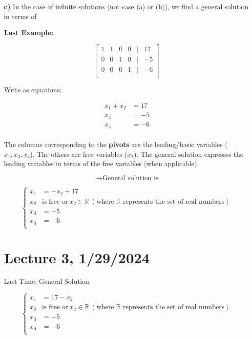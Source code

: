 \documentclass{article}
\begin{document}
\textbf{c)} In the case of infinite solutions (not case (a) or (b)), we find a general solution in terms of 

\medskip

\textbf{Last Example:}

\[
\begin{bmatrix}
    1 & 1 & 0 & 0 & | & 17 \\
    0 & 0 & 1 & 0 & | & -5 \\
    0 & 0 & 0 & 1 & | & -6 \\
\end{bmatrix}
\]

Write as equations:

\[
\begin{aligned}
    x_1 + x_2 &= 17 \\
    x_3 &= -5 \\
    x_4 &= -6 \\
\end{aligned}
\]

The columns corresponding to the \textbf{pivots} are the leading/basic variables (\(x_1, x_3, x_4\)). The others are free variables (\(x_2\)). The general solution expresses the leading variables in terms of the free variables (when applicable).

\[\rightarrow \text{General solution is}\]

\[
\begin{cases}
    x_1 &= -x_2 + 17 \\
    x_2 & \text{is free or} \ x_2 \in \mathbb{R} \ (\text{where } \mathbb{R} \text{ represents the set of real numbers}) \\
    x_3 &= -5 \\
    x_4 &= -6 \\
\end{cases}
\]


\section{Lecture 3, 1/29/2024}

Last Time: General Solution

\[
\begin{cases}
    x_1 &= 17-x_2  \\
    x_2 & \text{is free or} \ x_2 \in \mathbb{R} \ (\text{where } \mathbb{R} \text{ represents the set of real numbers}) \\
    x_3 &= -5 \\
    x_4 &= -6 \\
\end{cases}
\]
\end{document}
